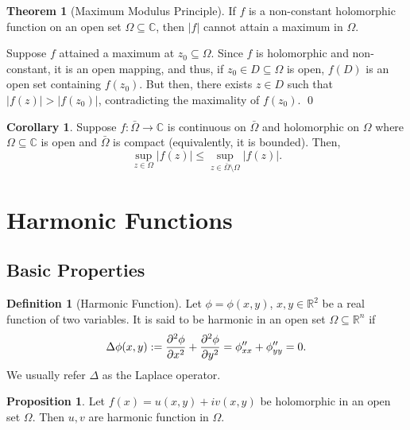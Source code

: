 \documentclass[
]{article}
\theoremstyle{definition}
\newtheorem{theorem}{Theorem}
\newtheorem{prop}{Proposition}
\newtheorem{corollary}{Corollary}[theorem]
\theoremstyle{definition}
\newtheorem{definition}{Definition}[section]
\begin{document}
\begin{theorem}[Maximum Modulus Principle]
  If \(f\) is a non-constant holomorphic function on an open set \(\Omega \subseteq \mathbb{C}\), 
  then \(|f|\) cannot attain a maximum in \(\Omega\).
\end{theorem}
\proof

Suppose \(f\) attained a maximum at \(z_0 \subseteq \Omega\). Since
\(f\) is holomorphic and non-constant, it is an open mapping, and thus,
if \(z_0 \in D \subseteq \Omega\) is open, \(f(D)\) is an open set
containing \(f(z_0)\). But then, there exists \(z \in D\) such that
\(|f(z)| > |f(z_0)|\), contradicting the maximality of \(f(z_0)\). \qed

\begin{corollary}
  Suppose \(f : \bar \Omega \to \mathbb{C}\) is continuous on \(\bar \Omega\) 
  and holomorphic on \(\Omega\) where \(\Omega \subseteq \mathbb{C}\) is open 
  and \(\bar \Omega\) is compact (equivalently, it is bounded). 
  Then, 
  \[\sup_{z \in \Omega}|f(z)| \le \sup_{z \in \bar \Omega \setminus \Omega} |f(z)|.\]
\end{corollary}

\newpage

\hypertarget{harmonic-functions}{%
\section{Harmonic Functions}\label{harmonic-functions}}

\hypertarget{basic-properties}{%
\subsection{Basic Properties}\label{basic-properties}}

\begin{definition}[Harmonic Function]
  Let \(\phi = \phi(x, y)\), \(x, y \in \mathbb{R}^2\) be a real function of two 
  variables. It is said to be harmonic in an open set \(\Omega \subseteq \mathbb{R}^n\) 
  if 
  \[\Delta \phi(x, y) := \pdv[2]{\phi}{x} + \pdv[2]{\phi}{y} = 
    \phi''_{xx} + \phi''_{yy} = 0.\]
  We usually refer \(\Delta\) as the Laplace operator.
\end{definition}

\begin{prop}
  Let \(f(x) = u(x, y) + iv(x, y)\) be holomorphic in an open set \(\Omega\). 
  Then \(u, v\) are harmonic function in \(\Omega\).
\end{prop}
\proof
\end{document}
